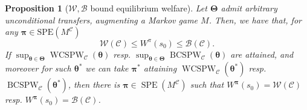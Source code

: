 \documentclass[referee,sn-basic]{sn-jnl}
\newcommand{\btheta}{\boldsymbol{\theta}}
\newcommand{\bpi}{\boldsymbol{\pi}}
\newcommand{\bTheta}{\boldsymbol{\Theta}}
\newcommand{\SPE}{\operatorname{SPE}}
\theoremstyle{thmstyleone}%
\newtheorem{proposition}[theorem]{Proposition}%
\theoremstyle{thmstyletwo}%
\theoremstyle{thmstylethree}%
\begin{document}
\begin{proposition}[$\mathcal{W}, \mathcal{B}$ bound equilibrium welfare]\label{thm:autspace}
    Let $\bTheta$ admit arbitrary unconditional transfers, augmenting a Markov game $M$. Then, we have that, for any $\bpi \in \mathrm{SPE}(M^{\mathcal{C}})$
    \[
    \mathcal{W}(\mathcal{C}) \le W^\pi(s_0) \le \mathcal{B}(\mathcal{C}).
    \]
    If $\sup_{\btheta \in \bTheta} \operatorname{WCSPW}_\mathcal{C}(\btheta)$ resp. $\sup_{\btheta \in \bTheta} \operatorname{BCSPW}_\mathcal{C}(\btheta)$ are attained, and moreover for such $\btheta^*$ we can take $\bpi^*$ attaining $\operatorname{WCSPW}_\mathcal{C}(\btheta^*)$ resp. $\operatorname{BCSPW}_\mathcal{C}(\btheta^*)$, then there is $\bpi \in \SPE(M^{\mathcal C})$ such that $W^{\bpi} (s_0) = \mathcal W (\mathcal C)$ resp. $W^{\bpi} (s_0) = \mathcal B (\mathcal C)$. 
\end{proposition}
\end{document}
